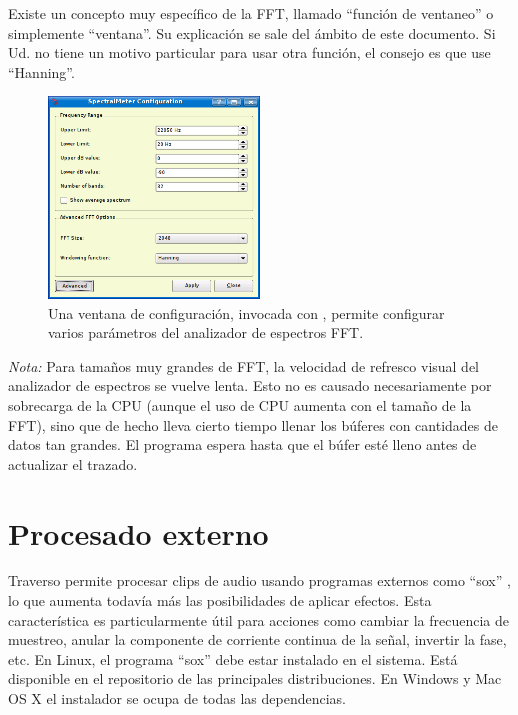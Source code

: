 Existe un concepto muy específico de la FFT, llamado ``función de ventaneo'' o simplemente ``ventana''. Su explicación se sale del ámbito de este documento. Si Ud. no tiene un motivo particular para usar otra función, el consejo es que use ``Hanning''.

\begin{figure}
	\centering
	\includegraphics[width=0.5\textwidth]{../images/fft3.png}
	\caption{Una ventana de configuración, invocada con , permite configurar varios parámetros del analizador de espectros FFT.}
	\label{fig_fft3}
\end{figure}

\emph{Nota:} Para tamaños muy grandes de FFT, la velocidad de refresco visual del analizador de espectros se vuelve lenta. Esto no es causado necesariamente por sobrecarga de la CPU (aunque el uso de CPU aumenta con el tamaño de la FFT), sino que de hecho lleva cierto tiempo llenar los búferes con cantidades de datos tan grandes. El programa espera hasta que el búfer esté lleno antes de actualizar el trazado.

\section{Procesado externo}
Traverso permite procesar clips de audio usando programas externos como ``sox'' \cite{sox}, lo que aumenta todavía más las posibilidades de aplicar efectos. Esta característica es particularmente útil para acciones como cambiar la frecuencia de muestreo, anular la componente de corriente continua de la señal, invertir la fase, etc. En Linux, el programa ``sox'' debe estar instalado en el sistema. Está disponible en el repositorio de las principales distribuciones. En Windows y Mac OS X el instalador se ocupa de todas las dependencias.

